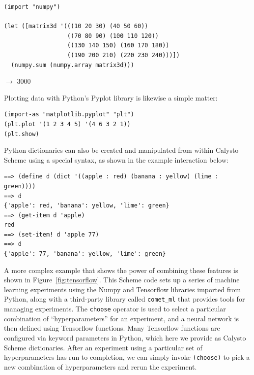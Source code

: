 \documentclass[acmsmall,screen,authorversion]{acmart}
\begin{document}
\begin{minipage}{\textwidth}
{\small
\begin{verbatim}
(import "numpy")

(let ([matrix3d '(((10 20 30) (40 50 60))
                  ((70 80 90) (100 110 120))
                  ((130 140 150) (160 170 180))
                  ((190 200 210) (220 230 240)))])
  (numpy.sum (numpy.array matrix3d)))
\end{verbatim}
$\rightarrow$ 3000\\
}
\end{minipage}

\noindent
Plotting data with Python's Pyplot library is likewise a simple matter:

{\small
\begin{verbatim}
(import-as "matplotlib.pyplot" "plt")
(plt.plot '(1 2 3 4 5) '(4 6 3 2 1))
(plt.show)
\end{verbatim}
}

\noindent
Python dictionaries can also be created and manipulated from within Calysto
Scheme using a special syntax, as shown in the example interaction below:\\

\begin{minipage}{\textwidth}
{\small
\begin{verbatim}
==> (define d (dict '((apple : red) (banana : yellow) (lime : green))))
==> d
{'apple': red, 'banana': yellow, 'lime': green}
==> (get-item d 'apple)
red
==> (set-item! d 'apple 77)
==> d
{'apple': 77, 'banana': yellow, 'lime': green}
\end{verbatim}
}
\end{minipage}

\noindent
A more complex example that shows the power of combining these features is
shown in Figure~\ref{fig:tensorflow}. This Scheme code sets up a series of
machine learning experiments using the Numpy and Tensorflow libraries imported
from Python, along with a third-party library called \texttt{comet\_ml} that
provides tools for managing experiments.  The \texttt{choose} operator is used
to select a particular combination of ``hyperparameters'' for an experiment,
and a neural network is then defined using Tensorflow functions.  Many
Tensorflow functions are configured via keyword parameters in Python, which
here we provide as Calysto Scheme dictionaries.  After an experiment using a
particular set of hyperparameters has run to completion, we can simply invoke
\texttt{(choose)} to pick a new combination of hyperparameters and rerun the
experiment.
\end{document}
